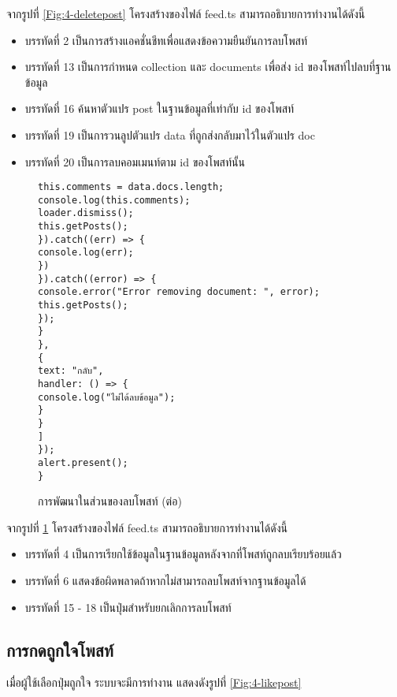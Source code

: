 จากรูปที่ \ref{Fig:4-deletepost} โครงสร้างของไฟล์ feed.ts สามารถอธิบายการทำงานได้ดังนี้
\begin{itemize}[label={--}]
\item บรรทัดที่ 2 เป็นการสร้างแอคชั่นชีทเพื่อแสดงข้อความยืนยันการลบโพสท์
\item บรรทัดที่ 13 เป็นการกำหนด collection และ documents เพื่อส่ง id ของโพสท์ไปลบที่ฐานข้อมูล
\item บรรทัดที่ 16 ค้นหาตัวแปร post ในฐานข้อมูลที่เท่ากับ id ของโพสท์
\item บรรทัดที่ 19 เป็นการวนลูปตัวแปร data ที่ถูกส่งกลับมาไว้ในตัวแปร doc
\item บรรทัดที่ 20 เป็นการลบคอมเมนท์ตาม id ของโพสท์นั้น
\end{itemize}
\newpage



\begin{figure}[H]
	{\lstset{language=Pascal}
	\begin{lstlisting}
this.comments = data.docs.length;
console.log(this.comments);
loader.dismiss();
this.getPosts();
}).catch((err) => {
console.log(err);
})
}).catch((error) => {
console.error("Error removing document: ", error);
this.getPosts();
});
}
},
{
text: "กลับ",
handler: () => {
console.log("ไม่ได้ลบข้อมูล");
}
}
]
});
alert.present();
}
	\end{lstlisting}}
	\caption{การพัฒนาในส่วนของลบโพสท์ (ต่อ)}
	\label{Fig:4-deletepostcon1}
	\end{figure}
	
	จากรูปที่ \ref{Fig:4-deletepostcon1} โครงสร้างของไฟล์ feed.ts สามารถอธิบายการทำงานได้ดังนี้
	\begin{itemize}[label={--}]
	\item บรรทัดที่ 4 เป็นการเรียกใช้ข้อมูลในฐานข้อมูลหลังจากที่โพสท์ถูกลบเรียบร้อยแล้ว
	\item บรรทัดที่ 6 แสดงข้อผิดพลาดถ้าหากไม่สามารถลบโพสท์จากฐานข้อมูลได้
	\item บรรทัดที่ 15 - 18 เป็นปุ่มสำหรับยกเลิกการลบโพสท์
	\end{itemize}
	\newpage
	


\subsection{การกดถูกใจโพสท์}
เมื่อผู้ใช้เลือกปุ่มถูกใจ ระบบจะมีการทำงาน แสดงดังรูปที่ \ref{Fig:4-likepost}

